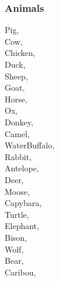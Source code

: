 \documentclass[11pt]{article}
\begin{document}
\subsubsection{Animals}
\label{sec:org7a42522}
Pig,\\
Cow,\\
Chicken,\\
Duck,\\
Sheep,\\
Goat,\\
Horse,\\
Ox,\\
Donkey,\\
Camel,\\
WaterBuffalo,\\
Rabbit,\\
Antelope,\\
Deer,\\
Moose,\\
Capybara,\\
Turtle,\\
Elephant,\\
Bison,\\
Wolf,\\
Bear,\\
Caribou,\\
\end{document}

